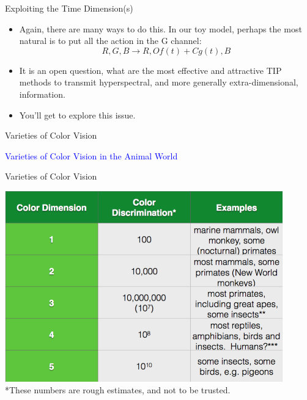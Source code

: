 \documentclass{beamer}
\begin{document}
\begin{frame}{Exploiting the Time Dimension(s)}
   \begin{itemize}
      \item Again, there are many ways to do this. In our toy model, perhaps the most natural is to put all the action in the G channel:
      \begin{equation}
         {R,G,B} \rightarrow {R, Of(t)+Cg(t),B}
      \end{equation}
      \item It is an open question, what are the most effective and attractive TIP methods to transmit hyperspectral, and more generally extra-dimensional, information.
      \item You'll get to explore this issue.
   \end{itemize}
\end{frame}

\begin{frame}{Varieties of Color Vision}
   \begin{center}
      \Huge \textcolor{blue}{Varieties of Color Vision in the Animal World}
   \end{center}
\end{frame}

\begin{frame}{Varieties of Color Vision}
   \begin{center}
      \includegraphics[width=0.9\textwidth]{figures/colordiscrimination.png}
      \\ *These numbers are rough estimates, and not to be trusted.
   \end{center}
\end{frame}
\end{document}
